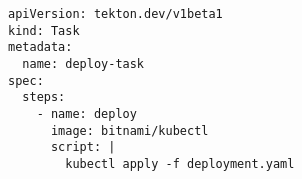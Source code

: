 \begin{verbatim}
apiVersion: tekton.dev/v1beta1
kind: Task
metadata:
  name: deploy-task
spec:
  steps:
    - name: deploy
      image: bitnami/kubectl
      script: |
        kubectl apply -f deployment.yaml
\end{verbatim}